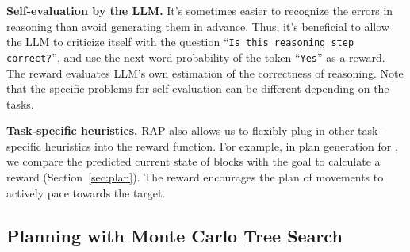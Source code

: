 \noindent \textbf{Self-evaluation by the LLM.}
It's sometimes easier to recognize the errors in reasoning than avoid generating them in advance. Thus, it's beneficial to allow the LLM to criticize itself with the question ``\texttt{Is this reasoning step correct?}'', and use the next-word probability of the token ``\texttt{Yes}'' as a reward. The reward evaluates LLM's own estimation of the correctness of reasoning. Note that the specific problems for self-evaluation can be different depending on the tasks.


\noindent \textbf{Task-specific heuristics.}
RAP also allows us to flexibly plug in other task-specific heuristics into the reward function. For example, in plan generation for \blocksworld, we compare the predicted current state of blocks with the goal to calculate a reward (Section~\ref{sec:plan}). The reward encourages the plan of movements to actively pace towards the target.






\subsection{Planning with Monte Carlo Tree Search} \label{sec:mcts}


